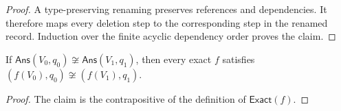 \begin{proof}
A type-preserving renaming preserves references and dependencies.
It therefore maps every deletion step to the corresponding step in the renamed record.
Induction over the finite acyclic dependency order proves the claim.
\end{proof}

\begin{lemma}
\label{lem:app-observational-separation}
If \(\mathsf{Ans}(V_0,q_0)\not\cong\mathsf{Ans}(V_1,q_1)\), then every exact \(f\) satisfies \((f(V_0),q_0)\not\cong(f(V_1),q_1)\).
\end{lemma}

\begin{proof}
The claim is the contrapositive of the definition of \(\mathsf{Exact}(f)\).
\end{proof}

